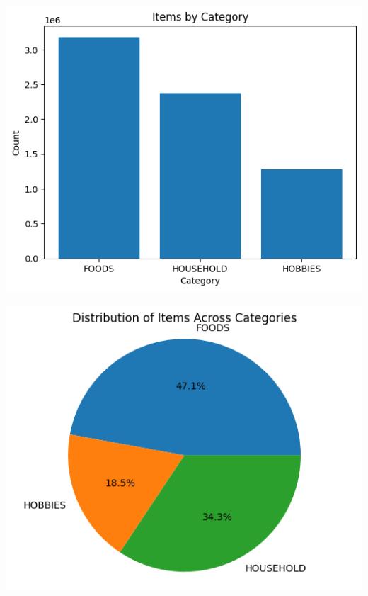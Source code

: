 \documentclass[fleqn,10pt]{SelfArx} %
\begin{document}
\includegraphics[scale=0.5]{22.png}

\includegraphics[scale=0.5]{23.png}
\end{document}
